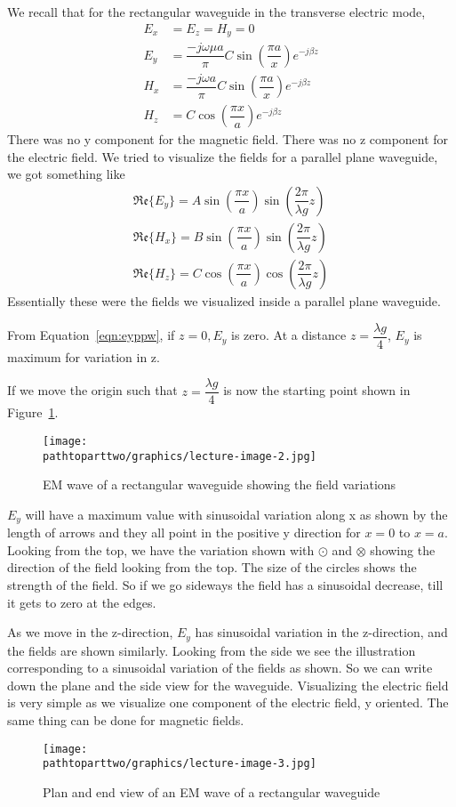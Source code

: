 We recall that for the rectangular waveguide in the transverse electric mode,
\begin{align*}
E_{x} &= E_{z} = H_{y} = 0\\
E_{y} &= \dfrac{-j\omega\mu a }{\pi} C\sin(\dfrac{\pi a}{x}) e ^{-j\beta z}\\
H_{x} &= \dfrac{-j\omega a}{\pi} C \sin(\dfrac{\pi a}{x})e^{-j\beta z} \\
H_{z} &= C\cos(\dfrac{\pi x}{a}) e^{-j\beta z}
\end{align*}
There was no y component for the magnetic field. There was no z component for the electric field. We tried to visualize the fields for a parallel plane waveguide, we got something like 
\begin{align}
\mathfrak{Re}\{E_{y}\} = A\sin(\dfrac{\pi x}{a})\sin(\dfrac{2\pi}{\lambda g}z)
\label{eqn:eyppw}\\
\mathfrak{Re}\{H_{x}\} = B\sin(\dfrac{\pi x}{a})\sin(\dfrac{2\pi}{\lambda g}z)\\
\mathfrak{Re}\{H_{z}\} = C\cos(\dfrac{\pi x}{a})\cos(\dfrac{2\pi}{\lambda g}z)
\end{align}
Essentially these were the fields we visualized inside a parallel plane waveguide.

From Equation~\ref{eqn:eyppw}, if $z = 0, E_{y}$ is zero. At a distance $ z = \dfrac{\lambda g}{4}$, $E_{y}$ is maximum for variation in z.

If we move the origin such that $z = \dfrac{\lambda g}{4}$ is now the starting point shown in Figure~\ref{fig:lectureimage2}.
\begin{figure}[h]
\centering
\texttt{[image: \\pathtoparttwo/graphics/lecture-image-2.jpg]}
\label{fig:lectureimage2}
\caption{EM wave of a rectangular waveguide showing the field variations}
\end{figure}
$E_{y}$ will have a maximum value with sinusoidal variation along x as shown by the length of arrows and they all point in the positive y direction for $x = 0$ to $x = a$. Looking from the top, we have the variation shown with $\odot$ and $\otimes$ showing the direction of the field looking from the top. The size of the circles shows the strength of the field. So if we go sideways the field has a sinusoidal decrease, till it gets to zero at the edges.
 
As we move in the z-direction, $E_{y}$ has sinusoidal variation in the z-direction, and the fields are shown similarly. Looking from the side we see the illustration corresponding to a sinusoidal variation of the fields as shown. So we can write down the plane and the side view for the waveguide. Visualizing the electric field is very simple as we visualize one component of the electric field, y oriented. The same thing can be done for magnetic fields.
\begin{figure}[h]
\centering
\texttt{[image: \\pathtoparttwo/graphics/lecture-image-3.jpg]}
\label{fig:lectureimage3}
\caption{Plan and end view of an EM wave of a rectangular waveguide}
\end{figure}

